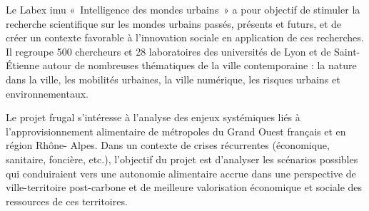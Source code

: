 Le Labex {\sc imu} « Intelligence des mondes urbains » a pour objectif de stimuler la recherche scientifique
sur les mondes urbains passés, présents et futurs, et de créer un contexte favorable à l'innovation sociale
en application de ces recherches. Il regroupe 500 chercheurs et 28 laboratoires des universités de Lyon et de Saint-Étienne
autour de nombreuses thématiques de la ville contemporaine :
la nature dans la ville, les mobilités urbaines, la ville numérique, les risques urbains et environnementaux.

Le projet {\sc frugal}  s'intéresse à  l’analyse   des   enjeux   systémiques   liés   à
l’approvisionnement alimentaire de métropoles du Grand Ouest français et en région Rhône-
Alpes. Dans un contexte de crises récurrentes (économique, sanitaire, foncière, etc.), l'objectif du projet
est d'analyser les scénarios possibles qui conduiraient vers une autonomie alimentaire accrue dans une perspective de ville-territoire
post-carbone et de meilleure valorisation économique et sociale des ressources de ces
territoires.